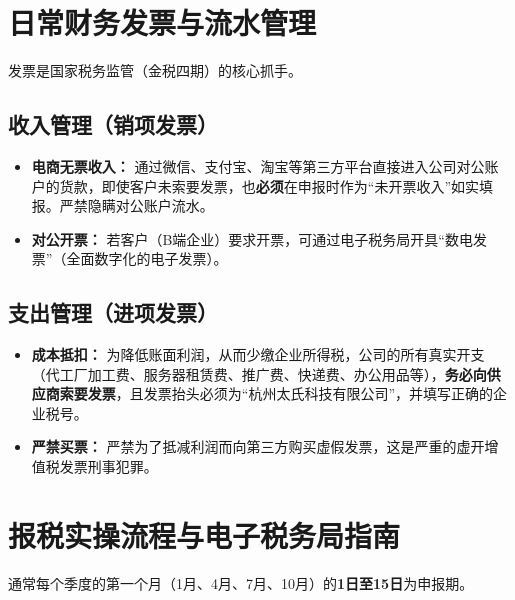 \documentclass[a4paper, 12pt]{ctexart}
\begin{document}
\section{日常财务发票与流水管理}
发票是国家税务监管（金税四期）的核心抓手。

\subsection{收入管理（销项发票）}
\begin{itemize}
    \item \textbf{电商无票收入：} 通过微信、支付宝、淘宝等第三方平台直接进入公司对公账户的货款，即使客户未索要发票，也\textbf{必须}在申报时作为“未开票收入”如实填报。严禁隐瞒对公账户流水。
    \item \textbf{对公开票：} 若客户（B端企业）要求开票，可通过电子税务局开具“数电发票”（全面数字化的电子发票）。
\end{itemize}

\subsection{支出管理（进项发票）}
\begin{itemize}
    \item \textbf{成本抵扣：} 为降低账面利润，从而少缴企业所得税，公司的所有真实开支（代工厂加工费、服务器租赁费、推广费、快递费、办公用品等），\textbf{务必向供应商索要发票}，且发票抬头必须为“杭州太氏科技有限公司”，并填写正确的企业税号。
    \item \textbf{严禁买票：} 严禁为了抵减利润而向第三方购买虚假发票，这是严重的虚开增值税发票刑事犯罪。
\end{itemize}

\section{报税实操流程与电子税务局指南}

\begin{tcolorbox}[colback=lightgray, colframe=taigreen, title=常规季度报税时间节点]
通常每个季度的第一个月（1月、4月、7月、10月）的\textbf{1日至15日}为申报期。
\end{tcolorbox}
\end{document}
